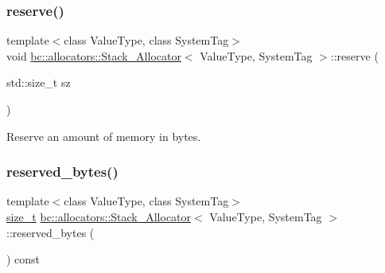 \subsubsection{\texorpdfstring{reserve()}{reserve()}}
{\footnotesize\ttfamily template$<$class Value\+Type, class System\+Tag$>$ \\
void \hyperlink{classbc_1_1allocators_1_1Stack__Allocator}{bc\+::allocators\+::\+Stack\+\_\+\+Allocator}$<$ Value\+Type, System\+Tag $>$\+::reserve (\begin{DoxyParamCaption}\item[{std\+::size\+\_\+t}]{sz }\end{DoxyParamCaption})\hspace{0.3cm}{\ttfamily [inline]}}



Reserve an amount of memory in bytes. 

\mbox{\label{classbc_1_1allocators_1_1Stack__Allocator_a29decb9ba112eb6b73955a74955e9a64}} 
\subsubsection{\texorpdfstring{reserved\+\_\+bytes()}{reserved\_bytes()}}
{\footnotesize\ttfamily template$<$class Value\+Type, class System\+Tag$>$ \\
\hyperlink{namespacebc_aaf8e3fbf99b04b1b57c4f80c6f55d3c5}{size\+\_\+t} \hyperlink{classbc_1_1allocators_1_1Stack__Allocator}{bc\+::allocators\+::\+Stack\+\_\+\+Allocator}$<$ Value\+Type, System\+Tag $>$\+::reserved\+\_\+bytes (\begin{DoxyParamCaption}{ }\end{DoxyParamCaption}) const\hspace{0.3cm}{\ttfamily [inline]}}

\mbox{\label{classbc_1_1allocators_1_1Stack__Allocator_aa67df701b95b32e4781f1b607a275f16}} 
